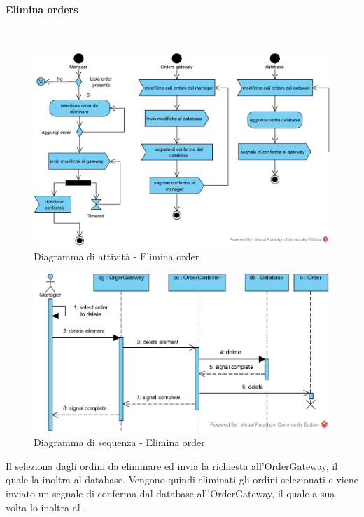 \paragraph{Elimina orders}\mbox{}\\
\nopagebreak
\begin{figure}[H]
	\centering
	\includegraphics[width=14cm]{diagrammi_img/attivita/manager_order_remove.png}
	\caption{Diagramma di attività - Elimina order}
\end{figure}

\begin{figure}[H]
	\centering
	\includegraphics[width=14cm]{diagrammi_img/sequenza/direttore_elimina_orders.png}
	\caption{Diagramma di sequenza - Elimina order}
\end{figure}
Il \Manager{} seleziona dagli ordini da eliminare ed invia la richiesta all'Order\-Gateway, il quale la inoltra al database. Vengono quindi eliminati gli ordini selezionati e viene inviato un segnale di conferma dal database all'Order\-Gateway, il quale a sua volta lo inoltra al \Manager{}.
